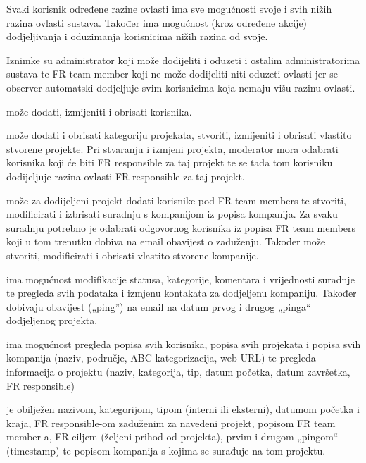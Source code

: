 		{Svaki korisnik određene razine ovlasti ima sve mogućnosti svoje i svih nižih razina ovlasti sustava. Također ima mogućnost (kroz određene akcije) dodjeljivanja i oduzimanja  korisnicima nižih razina od svoje.}

		{Iznimke su administrator koji može dodijeliti i oduzeti i ostalim administratorima sustava te FR team member koji ne može dodijeliti niti oduzeti ovlasti jer se observer automatski dodjeljuje svim korisnicima koja nemaju višu razinu ovlasti.}\vspace{0.3cm}
		
		
		{ može dodati, izmijeniti i obrisati korisnika.}\vspace{0.1cm}

		{ može dodati i obrisati kategoriju projekata, stvoriti, izmijeniti i obrisati vlastito stvorene projekte. Pri stvaranju i izmjeni projekta, moderator mora odabrati korisnika koji će biti FR responsible za taj projekt te se tada tom korisniku dodijeljuje razina ovlasti FR responsible za taj projekt.}\vspace{0.1cm}

		{ može za dodijeljeni projekt dodati korisnike pod FR team members te stvoriti, modificirati i izbrisati suradnju s kompanijom iz popisa kompanija. Za svaku suradnju potrebno je odabrati odgovornog korisnika iz popisa FR team members koji u tom trenutku dobiva na email obavijest o zaduženju. Također može stvoriti, modificirati i obrisati vlastito stvorene kompanije.}\vspace{0.1cm}

		{ ima mogućnost modifikacije statusa, kategorije, komentara i vrijednosti suradnje te pregleda svih podataka i izmjenu kontakata za dodjeljenu kompaniju. Također dobivaju obavijest („ping”) na email na datum prvog i drugog „pinga“ dodjeljenog projekta.}\vspace{0.1cm}

		{ ima mogućnost pregleda popisa svih korisnika, popisa svih projekata i popisa svih kompanija (naziv, područje, ABC kategorizacija, web URL) te pregleda informacija o projektu (naziv, kategorija, tip, datum početka, datum završetka, FR responsible)}\vspace{0.3cm}
		

		{ je obilježen nazivom, kategorijom, tipom (interni ili eksterni), datumom početka i kraja, FR responsible-om zaduženim za navedeni projekt, popisom FR team member-a, FR ciljem (željeni prihod od projekta), prvim i drugom „pingom“ (timestamp) te popisom kompanija s kojima se surađuje na tom projektu.}\vspace{0.1cm}

